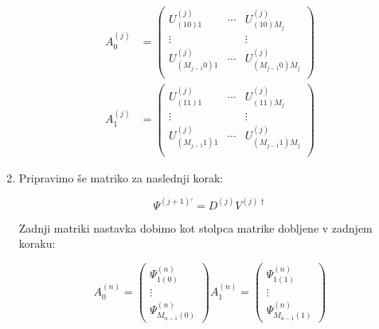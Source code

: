 \documentclass[a4paper]{article}
\begin{document}
\begin{enumerate}
            \begin{equation}\label{eq11}
                \begin{split}
                    A^{(j)}_0 &= \begin{pmatrix}
                        U^{(j)}_{(10)1}       & \cdots & U^{(j)}_{(10)M_j}     \\
                        \vdots                &        & \vdots                 \\
                        U^{(j)}_{(M_{j-1}0)1} & \cdots & U^{(j)}_{(M_{j-1}0)M_j} \\
                    \end{pmatrix} \\
                    A^{(j)}_1 &= \begin{pmatrix}
                        U^{(j)}_{(11)1}       & \cdots & U^{(j)}_{(11)M_j}     \\
                        \vdots                &        & \vdots                 \\
                        U^{(j)}_{(M_{j-1}1)1} & \cdots & U^{(j)}_{(M_{j-1}1)M_j} \\
                    \end{pmatrix}
                \end{split}
            \end{equation}

        \item Pripravimo še matriko za naslednji korak:

            \begin{equation}\label{eq12}
                \Psi^{(j+1)\prime} = D^{(j)}V^{(j)\dagger}
            \end{equation}

    Zadnji matriki nastavka dobimo kot stolpca matrike dobljene v zadnjem koraku:
 
    \begin{equation}\label{eq13}
        A^{(n)}_0 = \begin{pmatrix} \Psi^{(n)}_{1(0)} \\ \vdots \\ \Psi^{(n)}_{M_{n-1}(0)} \end{pmatrix}
        A^{(n)}_1 = \begin{pmatrix} \Psi^{(n)}_{1(1)} \\ \vdots \\ \Psi^{(n)}_{M_{n-1}(1)} \end{pmatrix}
    \end{equation}
           
    \end{enumerate}
\end{document}
